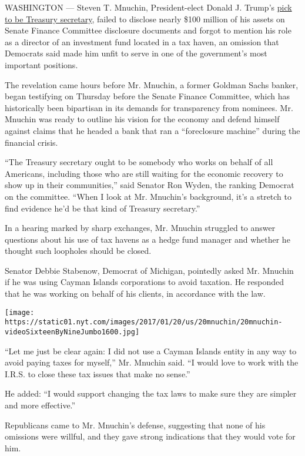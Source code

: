 WASHINGTON --- Steven T. Mnuchin, President-elect Donald J. Trump's
\href{https://www.nytimes.com/2016/11/29/us/politics/steven-terner-mnuchin-trump-treasury-secretary.html}{pick
to be Treasury secretary}, failed to disclose nearly \$100 million of
his assets on Senate Finance Committee disclosure documents and forgot
to mention his role as a director of an investment fund located in a tax
haven, an omission that Democrats said made him unfit to serve in one of
the government's most important positions.

The revelation came hours before Mr. Mnuchin, a former Goldman Sachs
banker, began testifying on Thursday before the Senate Finance
Committee, which has historically been bipartisan in its demands for
transparency from nominees. Mr. Mnuchin was ready to outline his vision
for the economy and defend himself against claims that he headed a bank
that ran a ``foreclosure machine'' during the financial crisis.

``The Treasury secretary ought to be somebody who works on behalf of all
Americans, including those who are still waiting for the economic
recovery to show up in their communities,'' said Senator Ron Wyden, the
ranking Democrat on the committee. ``When I look at Mr. Mnuchin's
background, it's a stretch to find evidence he'd be that kind of
Treasury secretary.''

In a hearing marked by sharp exchanges, Mr. Mnuchin struggled to answer
questions about his use of tax havens as a hedge fund manager and
whether he thought such loopholes should be closed.

Senator Debbie Stabenow, Democrat of Michigan, pointedly asked Mr.
Mnuchin if he was using Cayman Islands corporations to avoid taxation.
He responded that he was working on behalf of his clients, in accordance
with the law.

\texttt{[image: https://static01.nyt.com/images/2017/01/20/us/20mnuchin/20mnuchin-videoSixteenByNineJumbo1600.jpg]}

``Let me just be clear again: I did not use a Cayman Islands entity in
any way to avoid paying taxes for myself,'' Mr. Mnuchin said. ``I would
love to work with the I.R.S. to close these tax issues that make no
sense.''

He added: ``I would support changing the tax laws to make sure they are
simpler and more effective.''

Republicans came to Mr. Mnuchin's defense, suggesting that none of his
omissions were willful, and they gave strong indications that they would
vote for him.

